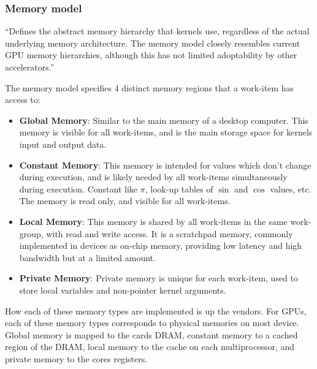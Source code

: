 \subsubsection{Memory model}


``Defines the abstract memory hierarchy that kernels use, regardless of
the actual underlying memory architecture. The memory model closely
resembles current GPU memory hierarchies, although this has not
limited adoptability by other accelerators.''

The memory model specifies 4 distinct memory regions that a work-item
has access to:

\begin{itemize}
\item \textbf{Global Memory}: Similar to the main memory of a desktop
  computer. This memory is visible for all work-items, and is the main
  storage space for kernels input and output data.

\item \textbf{Constant Memory}: This memory is intended for values
  which don't change during execution, and is likely needed by all
  work-items simultaneously during execution. Constant like $\pi$,
  look-up tables of $\sin$ and $\cos$ values, etc. The memory is
  read only, and visible for all work-items.

\item \textbf{Local Memory}: This memory is shared by all work-items
  in the same work-group, with read and write access. It is a
  scratchpad memory, commonly implemented in devices as on-chip memory,
  providing low latency and high bandwidth but at a limited amount.

\item \textbf{Private Memory}: Private memory is unique for each
  work-item, used to store local variables and non-pointer kernel
  arguments.

\end{itemize}

How each of these memory types are implemented is up the vendors. For
GPUs, each of these memory types corresponds to physical memories on
most device. Global memory is mapped to the cards DRAM, constant
memory to a cached region of the DRAM, local memory to the cache on
each multiprocessor, and private memory to the cores registers.

